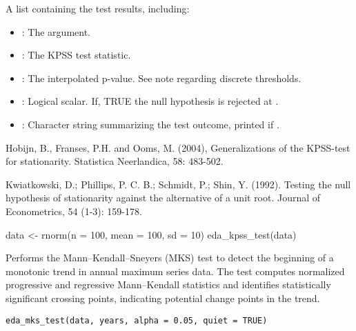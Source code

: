 \documentclass[a4paper]{book}
\begin{document}
%
\begin{Value}
A list containing the test results, including:
\begin{itemize}

\item{} : The  argument.
\item{} : The KPSS test statistic.
\item{} : The interpolated p-value. See note regarding discrete thresholds.
\item{} : Logical scalar. If, TRUE the null hypothesis is rejected at .
\item{} : Character string summarizing the test outcome, printed if .

\end{itemize}

\end{Value}
%
\begin{References}
Hobijn, B., Franses, P.H. and Ooms, M. (2004), Generalizations of the KPSS-test
for stationarity. Statistica Neerlandica, 58: 483-502.

Kwiatkowski, D.; Phillips, P. C. B.; Schmidt, P.; Shin, Y. (1992). Testing the null
hypothesis of stationarity against the alternative of a unit root. Journal of
Econometrics, 54 (1-3): 159-178.
\end{References}
%
\begin{SeeAlso}
\end{SeeAlso}
%
\begin{Examples}
\begin{ExampleCode}
data <- rnorm(n = 100, mean = 100, sd = 10)
eda_kpss_test(data)

\end{ExampleCode}
\end{Examples}
%
\begin{Description}
Performs the Mann–Kendall–Sneyers (MKS) test to detect the beginning of a monotonic
trend in annual maximum series data. The test computes normalized
progressive and regressive Mann–Kendall statistics and identifies statistically
significant crossing points, indicating potential change points in the trend.
\end{Description}
%
\begin{Usage}
\begin{verbatim}
eda_mks_test(data, years, alpha = 0.05, quiet = TRUE)
\end{verbatim}
\end{Usage}
\end{document}
